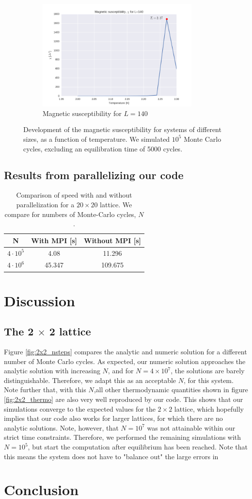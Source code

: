 \documentclass[a4paper, 10pt]{article}
\begin{document}
\begin{figure}[!ht]
\begin{subfigure}[H!]{0.5\textwidth}
        \centering
        \includegraphics[height=2.2in]{chil140.png}
        \caption{Magnetic susceptibility for $L=140$}
    \end{subfigure}
      \caption{Development of the magnetic susceptibility for systems of different sizes, as a function of temperature. We simulated $10^5$ Monte Carlo cycles, excluding an equilibration time of 5000 cycles.}
\end{figure}
\subsection{Results from parallelizing our code}
\begin{table}
\centering
\caption{Comparison of speed with and without parallelization for a $20 \times 20$ lattice. We compare for numbers of Monte-Carlo cycles, $N$.}
\begin{tabular}{|c|c|c|}
\hline
N & With MPI [s] &  Without MPI [s]\\
\hline
\rule{0pt}{2ex}    
$4\cdot 10^5$ & 4.08 & 11.296 \\
$4 \cdot 10^6$ & 45.347 & 109.675\\ 
\hline
\end{tabular}
\end{table}
\section{Discussion}
\subsection{The 2 $\times$ 2 lattice}
Figure \ref{fig:2x2_nsteps} compares the analytic and numeric solution for a different number of Monte Carlo cycles. As expected, our numeric solution approaches the analytic solution with increasing $N$, and for $N=4\times 10^7$, the solutions are barely distinguishable. Therefore, we adapt this as an acceptable $N$, for this system.  Note further that, with this $N$,all other thermodynamic quantities shown in figure \ref{fig:2x2_thermo} are also very well reproduced by our code. This shows that our simulations converge to the expected values for the $2\times2$ lattice, which hopefully implies that our code also works for larger lattices, for which there are no analytic solutions. Note, however, that $N=10^7$ was not attainable within our strict time constraints. Therefore, we performed the remaining simulations with $N=10^5$, but start the computation after equilibrium has  been reached. Note that this means the system does not have to "balance out" the large errors in 
\section{Conclusion}
\end{document}
